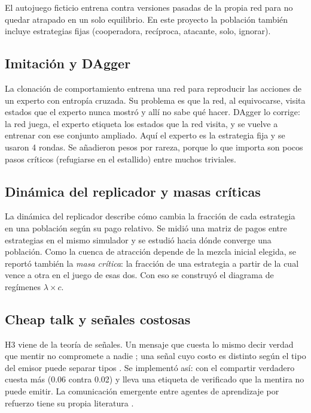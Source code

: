 \documentclass[11pt,a4paper]{article}
\newcommand{\codigo}[1]{\texttt{\detokenize{#1}}}
\begin{document}
El autojuego ficticio \cite{heinrich2016} entrena contra versiones pasadas de la propia red para no quedar atrapado en un solo equilibrio. En este proyecto la poblaci\'on tambi\'en incluye estrategias fijas (cooperadora, rec\'iproca, atacante, solo, ignorar).

\subsection{Imitaci\'on y DAgger}

La clonaci\'on de comportamiento entrena una red para reproducir las acciones de un experto con entrop\'ia cruzada. Su problema es que la red, al equivocarse, visita estados que el experto nunca mostr\'o y all\'i no sabe qu\'e hacer. DAgger \cite{ross2011} lo corrige: la red juega, el experto etiqueta los estados que la red visita, y se vuelve a entrenar con ese conjunto ampliado. Aqu\'i el experto es la estrategia fija \codigo{coop_real} y se usaron 4 rondas. Se a\~nadieron pesos por rareza, porque lo que importa son pocos pasos cr\'iticos (refugiarse en el estallido) entre muchos triviales.

\subsection{Din\'amica del replicador y masas cr\'iticas}

La din\'amica del replicador \cite{taylor1978} describe c\'omo cambia la fracci\'on de cada estrategia en una poblaci\'on seg\'un su pago relativo. Se midi\'o una matriz de pagos entre estrategias en el mismo simulador y se estudi\'o hacia d\'onde converge una poblaci\'on. Como la cuenca de atracci\'on depende de la mezcla inicial elegida, se report\'o tambi\'en la \emph{masa cr\'itica}: la fracci\'on de una estrategia a partir de la cual vence a otra en el juego de esas dos. Con eso se construy\'o el diagrama de reg\'imenes $\lambda\times c$.

\subsection{Cheap talk y se\~nales costosas}

H3 viene de la teor\'ia de se\~nales. Un mensaje que cuesta lo mismo decir verdad que mentir no compromete a nadie \cite{crawford1982}; una se\~nal cuyo costo es distinto seg\'un el tipo del emisor puede separar tipos \cite{spence1973}. Se implement\'o as\'i: con \codigo{costly_signals} el compartir verdadero cuesta m\'as (0.06 contra 0.02) y lleva una etiqueta de verificado que la mentira no puede emitir. La comunicaci\'on emergente entre agentes de aprendizaje por refuerzo tiene su propia literatura \cite{foerster2016,lazaridou2020}.
\end{document}
